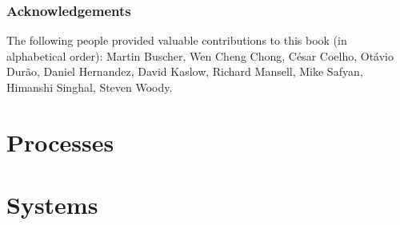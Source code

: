 \documentclass[11pt,fleqn]{book} %
\begin{document}
\section*{Acknowledgements}

The following people provided valuable contributions to this book (in alphabetical order):
Martin Buscher,
Wen Cheng Chong,
César Coelho, 
Otávio Durão, 
Daniel Hernandez,
David Kaslow,
Richard Mansell, 
Mike Safyan,
Himanshi Singhal,
Steven Woody.



\pagestyle{empty} %

\tableofcontents %

\clearpage %

\pagestyle{fancy} %


\setlength{\parskip}{0.6em}
\setlength{\parindent}{0pt}



\part{Processes}
\label{part:processes}









\part{Systems}
\end{document}
